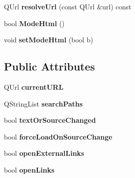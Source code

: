 \begin{DoxyCompactItemize}
\item 
\hypertarget{classraEdit_a845a844f4f4efb1387d51d13e1861c39}{
QUrl {\bfseries resolveUrl} (const QUrl \&url) const }
\label{classraEdit_a845a844f4f4efb1387d51d13e1861c39}

\item 
\hypertarget{classraEdit_a67ba2869e64b8e3322354599b4a8cc0d}{
bool {\bfseries ModeHtml} ()}
\label{classraEdit_a67ba2869e64b8e3322354599b4a8cc0d}

\item 
\hypertarget{classraEdit_ad4ba648986bbc4846a6d6be095f3c8b6}{
void {\bfseries setModeHtml} (bool b)}
\label{classraEdit_ad4ba648986bbc4846a6d6be095f3c8b6}

\end{DoxyCompactItemize}
\subsection*{Public Attributes}
\begin{DoxyCompactItemize}
\item 
\hypertarget{classraEdit_a210d3a47ab3fddf885284e3723537501}{
QUrl {\bfseries currentURL}}
\label{classraEdit_a210d3a47ab3fddf885284e3723537501}

\item 
\hypertarget{classraEdit_ad8de8a6739aa2b8d37e5eaa885eef5d9}{
QStringList {\bfseries searchPaths}}
\label{classraEdit_ad8de8a6739aa2b8d37e5eaa885eef5d9}

\item 
\hypertarget{classraEdit_aa2d846ccedea8fec0a55afafd47bae08}{
bool {\bfseries textOrSourceChanged}}
\label{classraEdit_aa2d846ccedea8fec0a55afafd47bae08}

\item 
\hypertarget{classraEdit_a26258974664a4d2569e3529d3bbab615}{
bool {\bfseries forceLoadOnSourceChange}}
\label{classraEdit_a26258974664a4d2569e3529d3bbab615}

\item 
\hypertarget{classraEdit_a4c576c4d9bae5471ba3f47ce68cff0c2}{
bool {\bfseries openExternalLinks}}
\label{classraEdit_a4c576c4d9bae5471ba3f47ce68cff0c2}

\item 
\hypertarget{classraEdit_a7148458a070db8a86e53637caacca1c9}{
bool {\bfseries openLinks}}
\label{classraEdit_a7148458a070db8a86e53637caacca1c9}

\end{DoxyCompactItemize}
